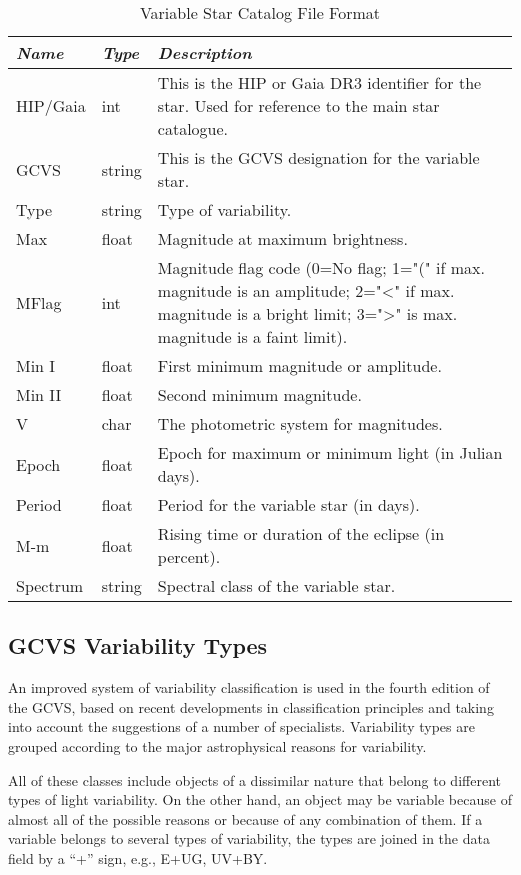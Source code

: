 \begin{table}[tb]
\begin{tabularx}{\textwidth}{l|l|X}\toprule
\emph{Name} & \emph{Type} & \emph{Description}\\\midrule
HIP/Gaia & int    & This is the HIP or Gaia DR3 identifier for the star. Used for reference to the main star catalogue.\\
GCVS     & string & This is the GCVS designation for the variable star.\\
Type     & string & Type of variability.\\
Max      & float  & Magnitude at maximum brightness.\\
MFlag    & int    & Magnitude flag code (0=No flag; 1="(" if max. magnitude is an amplitude; 
                    2="\textless{}" if max. magnitude is a bright limit; 
                    3="\textgreater{}" is max. magnitude is a faint limit).\\
Min I    & float  & First minimum magnitude or amplitude.\\
Min II   & float  & Second minimum magnitude.\\
V        & char   & The photometric system for magnitudes.\\
Epoch    & float  & Epoch for maximum or minimum light (in Julian days).\\
Period   & float  & Period for the variable star (in days).\\
M-m      & float  & Rising time or duration of the eclipse (in percent).\\
Spectrum & string & Spectral class of the variable star.\\\bottomrule
\end{tabularx}
\caption{Variable Star Catalog File Format}
\label{tab:sec:StarCatalogues:VariableStars}
\end{table}

\subsection{GCVS Variability Types}\label{gcvs-variability-types}

An improved system of variability classification is used in the fourth
edition of the GCVS, based on recent developments in classification
principles and taking into account the suggestions of a number of
specialists. Variability types are grouped according to the major
astrophysical reasons for variability.

All of these classes include objects of a dissimilar nature that belong
to different types of light variability. On the other hand, an object
may be variable because of almost all of the possible reasons or because
of any combination of them. If a variable belongs to several types of
variability, the types are joined in the data field by a ``+'' sign, e.g.,
E+UG, UV+BY.

